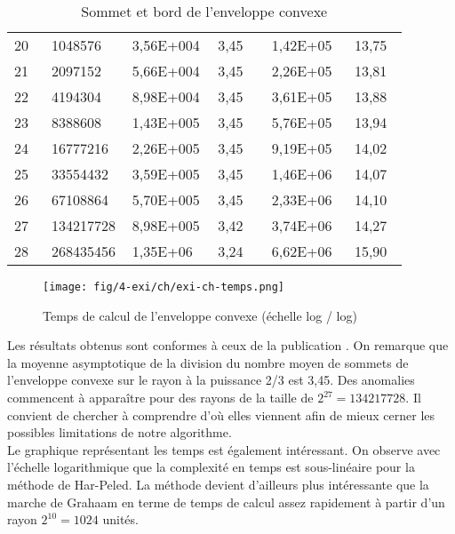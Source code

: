 \begin{table}[H]
\begin{tabular}{|p{0.09\linewidth}|p{0.13\linewidth}||p{0.2\linewidth}|p{0.13\linewidth}||p{0.2\linewidth}|p{0.13\linewidth}|}
    20 & 1048576   & 3,56E+004 & 3,45 & 1,42E+05 &  13,75\\
    21 & 2097152   & 5,66E+004 & 3,45 & 2,26E+05 &  13,81\\
    22 & 4194304   & 8,98E+004 & 3,45 & 3,61E+05 &  13,88\\
    23 & 8388608   & 1,43E+005 & 3,45 & 5,76E+05 &  13,94\\
    24 & 16777216  & 2,26E+005 & 3,45 & 9,19E+05 &  14,02\\
    25 & 33554432  & 3,59E+005 & 3,45 & 1,46E+06 &  14,07\\
    26 & 67108864  & 5,70E+005 & 3,45 & 2,33E+06 &  14,10\\
    27 & 134217728 & 8,98E+005 & 3,42 & 3,74E+06 &  14,27\\
    28 & 268435456 & 1,35E+06  & 3,24 & 6,62E+06 &  15,90\\
    \hline
  \end{tabular} 
  \caption{Sommet et bord de l'enveloppe convexe}
  \label{tab:ch} 
\end{table}

\begin{figure}[H]
  \centering
  \texttt{[image: fig/4-exi/ch/exi-ch-temps.png]}
  \caption{Temps de calcul de l'enveloppe convexe (échelle log / log)}
\label{tab:ch-time}   
\end{figure}


Les résultats obtenus sont conformes à ceux de la publication \cite{HarPeled98}. On remarque que la moyenne asymptotique de la division du nombre moyen de sommets de l'enveloppe convexe sur le rayon à la puissance 2/3 est 3,45. Des anomalies commencent à apparaître pour des rayons de la taille de $2^{27} = 134217728$. Il convient de chercher à comprendre d'où elles viennent afin de mieux cerner les possibles limitations de notre algorithme.\\

Le graphique représentant les temps est également intéressant. On observe avec l'échelle logarithmique que la complexité en temps est sous-linéaire pour la méthode de Har-Peled. La méthode devient d'ailleurs plus intéressante que la marche de Grahaam en terme de temps de calcul assez rapidement à partir d'un rayon $2^{10} = 1024$ unités. 




